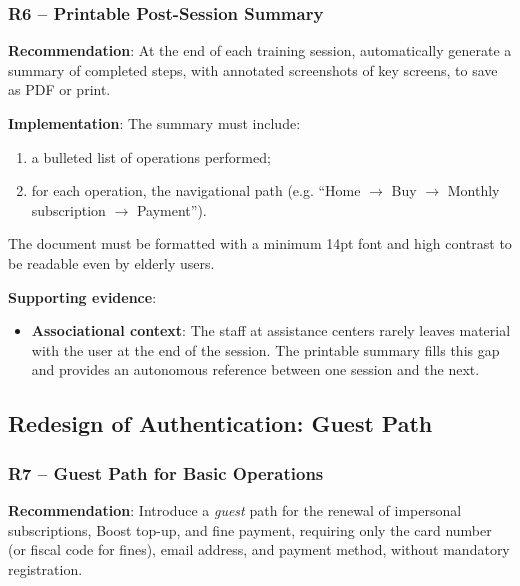 ﻿\documentclass[11pt,a4paper]{article}
\begin{document}
\subsubsection{R6 -- Printable Post-Session Summary}
\label{rec:R6}

\textbf{Recommendation}: At the end of each training session, automatically generate
a summary of completed steps, with annotated screenshots
of key screens, to save as PDF or print.

\textbf{Implementation}: The summary must include:
\begin{enumerate}
    \item a bulleted list of operations performed;
    \item for each operation, the navigational path (e.g.
    ``Home $\rightarrow$ Buy $\rightarrow$ Monthly subscription $\rightarrow$ Payment'').
\end{enumerate}
The document must be formatted with a minimum 14pt font and high
contrast to be readable even by elderly users.

\textbf{Supporting evidence}:
\begin{itemize}
    \item \textbf{Associational context}: The staff at assistance centers
    rarely leaves material with the user at the end of the
    session. The printable summary fills this gap and provides an
    autonomous reference between one session and the next.
\end{itemize}



\subsection{Redesign of Authentication: Guest Path}

\subsubsection{R7 -- Guest Path for Basic Operations}
\label{rec:R7}

\textbf{Recommendation}: Introduce a \textit{guest} path for
the renewal of impersonal subscriptions, Boost top-up, and fine
payment, requiring only the card number (or fiscal code
for fines), email address, and payment method, without
mandatory registration.
\end{document}
